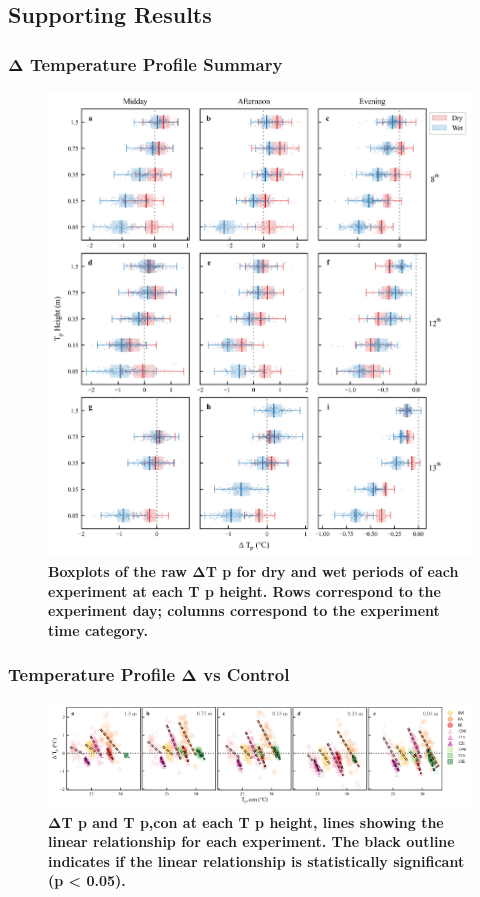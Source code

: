 \documentclass[final,3p,times,authoryear]{elsarticle}
\begin{document}
{\subsection{Supporting Results}\label{sec:appendix7.5}
\subsubsection{Δ Temperature Profile Summary}\label{sec:appendix7.5.1}

\begin{figure}
\centering
\includegraphics[trim={0 0 0 0},clip,scale=1.0]{pict038.png}
\caption{\bf Boxplots of the raw ΔT p for dry and wet periods of each experiment at each T p height. Rows
correspond to the experiment day; columns correspond to the experiment time category.}
 \label{fig:7.9}
\end{figure}

\subsubsection{Temperature Profile Δ vs Control}\label{sec:appendix7.5.2}

\begin{figure}
\centering
\includegraphics[trim={0 0 0 0},clip,scale=1.0]{pict039.png}
\caption{\bf ΔT p and T p,con at each T p height, lines showing the linear relationship for each experiment.
The black outline indicates if the linear relationship is statistically significant (p < 0.05).}
 \label{fig:7.10}
\end{figure}


}
\end{document}
